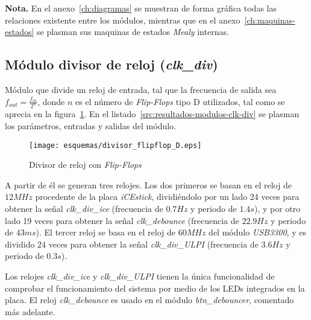\textbf{Nota.} En el anexo~\ref{ch:diagramas} se muestran de forma gráfica todas las relaciones existente entre los módulos, mientras que en el anexo~\ref{ch:maquinas-estados} se plasman sus maquinas de estados \emph{Mealy} internas.

\subsection{Módulo divisor de reloj (\emph{clk\_div})}
Módulo que divide un reloj de entrada, tal que la frecuencia de salida sea $f_{out} = \frac{f_{in}}{2^n}$, donde $n$ es el número de \emph{Flip-Flops} tipo D utilizados, tal como se aprecia en la figura~\ref{fig:clk_div_esquema}. En el listado~\ref{src:resultados-modulos-clk-div} se plasman los parámetros, entradas y salidas del módulo.

\begin{figure}[hbt]
    \centering
    \texttt{[image: esquemas/divisor\_flipflop\_D.eps]}
    \caption{Divisor de reloj con \emph{Flip-Flops}}
    \label{fig:clk_div_esquema}
\end{figure}

A partir de él se generan tres relojes. Los dos primeros se basan en el reloj de $12MHz$ procedente de la placa \emph{iCEstick}, dividiéndolo por un lado 24 veces para obtener la señal \emph{clk\_div\_ice} (frecuencia de $0.7Hz$ y periodo de $1.4s$), y por otro lado 19 veces para obtener la señal \emph{clk\_debounce} (frecuencia de $22.9Hz$ y periodo de $43ms$). El tercer reloj se basa en el reloj de $60MHz$ del módulo \emph{USB3300}, y es dividido 24 veces para obtener la señal \emph{clk\_div\_ULPI} (frecuencia de $3.6Hz$ y periodo de $0.3s$).

Los relojes \emph{clk\_div\_ice} y \emph{clk\_div\_ULPI} tienen la única funcionalidad de comprobar el funcionamiento del sistema por medio de los LEDs integrados en la placa. El reloj \emph{clk\_debounce} es usado en el módulo \emph{btn\_debouncer}, comentado más adelante.


